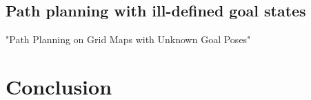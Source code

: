 \subsection{Path planning with ill-defined goal states}
"Path Planning on Grid Maps with Unknown Goal Poses"

\section{Conclusion}

\endinput
Any text after an \endinput is ignored.
\subsection{Definitions}
TODO put closer to where it's used

\begin{itemize}
\item Configuration space
\item Pointcloud space
\item 2D Map space
\item Ground Map
\item Object Map
\item Unknown Map
\item Feasible states
\item Desirability function
\end{itemize}
